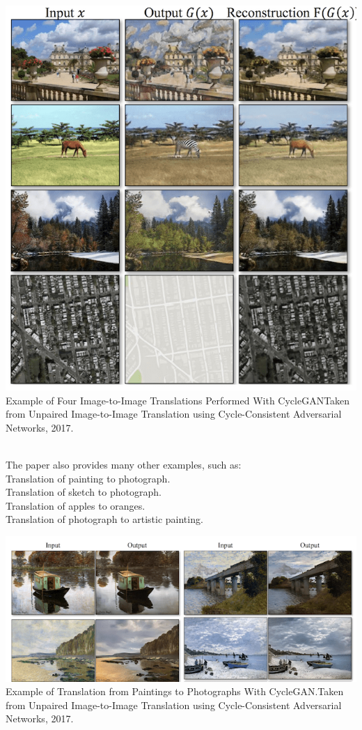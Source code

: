 \documentclass[14pt]{article}
\begin{document}
\begin{center}
    \includegraphics[width = 11 cm ]{12.png}
    Example of Four Image-to-Image Translations Performed With CycleGANTaken from Unpaired Image-to-Image Translation using Cycle-Consistent Adversarial Networks, 2017.
\end{center}
\\
The paper also provides many other examples, such as:\\
\hspace*{1cm}Translation of painting to photograph.
\\
\hspace*{1cm}Translation of sketch to photograph.
\\
\hspace*{1cm}Translation of apples to oranges.\\
\hspace*{1cm}Translation of photograph to artistic painting.\\

\begin{center}
    \includegraphics[width = 11 cm ]{13.png}
    Example of Translation from Paintings to Photographs With CycleGAN.Taken from Unpaired Image-to-Image Translation using Cycle-Consistent Adversarial Networks, 2017.
\end{center}
\end{document}
